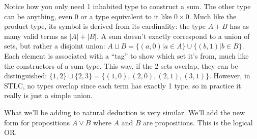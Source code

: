\documentclass[12pt]{article}
\begin{document}
\begin{prooftree}
\end{prooftree}

\begin{prooftree}
\end{prooftree}

\begin{prooftree}
\end{prooftree}

Notice how you only need 1 inhabited type to construct a sum. The other type can be anything, even $0$ or a type equivalent to it like $0 \times 0$. Much like the product type, its symbol is derived from its cardinality: the type $A + B$ has as many valid terms as $|A| + |B|$. A sum doesn't exactly correspond to a union of sets, but rather a disjoint union: $A \sqcup B = \{(a, 0) | a \in A\} \cup \{(b, 1) | b \in B\}$. Each element is associated with a ``tag'' to show which set it's from, much like the constructors of a sum type. This way, if the 2 sets overlap, they can be distinguished: $\{1, 2\} \sqcup \{2, 3\} = \{(1, 0), (2, 0), (2, 1), (3, 1)\}$. However, in STLC, no types overlap since each term has exactly 1 type, so in practice it really is just a simple union.

What we'll be adding to natural deduction is very similar. We'll add the new form for propositions $A \lor B$ where $A$ and $B$ are propositions. This is the logical OR.

\begin{prooftree}
\end{prooftree}

\begin{prooftree}
\end{prooftree}

\begin{prooftree}
\end{prooftree}
\end{document}
